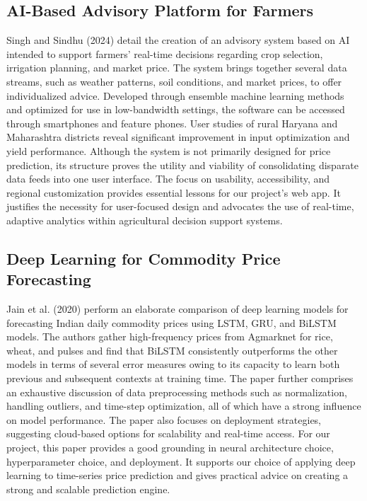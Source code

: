 \subsection{AI-Based Advisory Platform for Farmers \cite{singh2024ai}}
Singh and Sindhu (2024) detail the creation of an advisory system based on AI intended to support farmers' real-time decisions regarding crop selection, irrigation planning, and market price. The system brings together several data streams, such as weather patterns, soil conditions, and market prices, to offer individualized advice. Developed through ensemble machine learning methods and optimized for use in low-bandwidth settings, the software can be accessed through smartphones and feature phones. User studies of rural Haryana and Maharashtra districts reveal significant improvement in input optimization and yield performance. Although the system is not primarily designed for price prediction, its structure proves the utility and viability of consolidating disparate data feeds into one user interface. The focus on usability, accessibility, and regional customization provides essential lessons for our project's web app. It justifies the necessity for user-focused design and advocates the use of real-time, adaptive analytics within agricultural decision support systems.

\subsection{Deep Learning for Commodity Price Forecasting \cite{jain2020deep}}
Jain et al. (2020) perform an elaborate comparison of deep learning models for forecasting Indian daily commodity prices using LSTM, GRU, and BiLSTM models. The authors gather high-frequency prices from Agmarknet for rice, wheat, and pulses and find that BiLSTM consistently outperforms the other models in terms of several error measures owing to its capacity to learn both previous and subsequent contexts at training time. The paper further comprises an exhaustive discussion of data preprocessing methods such as normalization, handling outliers, and time-step optimization, all of which have a strong influence on model performance. The paper also focuses on deployment strategies, suggesting cloud-based options for scalability and real-time access. For our project, this paper provides a good grounding in neural architecture choice, hyperparameter choice, and deployment. It supports our choice of applying deep learning to time-series price prediction and gives practical advice on creating a strong and scalable prediction engine.

